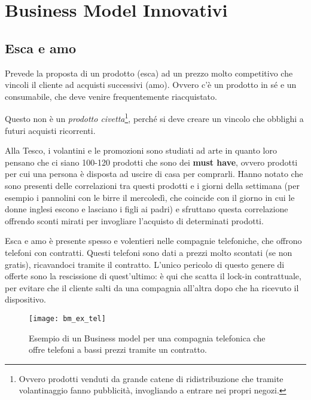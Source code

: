 \chapter{Business Model Innovativi}

\section{Esca e amo}

Prevede la proposta di un prodotto (esca) ad un prezzo molto competitivo che
vincoli il cliente ad acquisti successivi (amo). Ovvero c'è un prodotto in sé e
un consumabile, che deve venire frequentemente riacquistato.

Questo non è un \textit{prodotto civetta}\footnote{Ovvero prodotti venduti da
grande catene di ridistribuzione che tramite volantinaggio fanno pubblicità,
invogliando a entrare nei propri negozi.}, perché si deve creare un vincolo che
obblighi a futuri acquisti ricorrenti.

\begin{example}
Alla Tesco, i volantini e le promozioni sono studiati ad arte in quanto loro
pensano che ci siano 100-120 prodotti che sono dei \textbf{must have}, ovvero
prodotti per cui una persona è disposta ad uscire di casa per comprarli. Hanno
notato che sono presenti delle correlazioni tra questi prodotti e i
giorni della settimana (per esempio i pannolini con le birre il mercoledì, che
coincide con il giorno in cui le donne inglesi escono e lasciano i figli ai
padri) e sfruttano questa correlazione offrendo sconti mirati per invogliare
l'acquisto di determinati prodotti.
\end{example}

\noindent Esca e amo è presente spesso e volentieri nelle compagnie
telefoniche, che offrono telefoni con contratti. Questi telefoni sono dati a
prezzi molto scontati (se non gratis), ricavandoci tramite il contratto. L'unico
pericolo di questo genere di offerte sono la rescissione di quest'ultimo: è qui
che scatta il lock-in contrattuale, per evitare che il cliente salti da una
compagnia all'altra dopo che ha ricevuto il dispositivo.


\begin{figure}[t]
 \centering
 \texttt{[image: bm\_ex\_tel]}
 \caption[Business model per compagnia telefonica]{Esempio di un Business model
per una compagnia telefonica che offre telefoni a bassi prezzi tramite un
contratto.}
 \label{fig:bmi:ct}
\end{figure}

